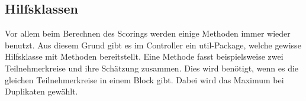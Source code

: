 \subsection{Hilfsklassen}\label{subsec:hilfsklassen}
Vor allem beim Berechnen des Scorings werden einige Methoden immer
wieder benutzt.
Aus diesem Grund gibt es im Controller ein util-Package,
welche gewisse Hilfsklasse mit Methoden bereitstellt.
Eine Methode fasst beispielsweise zwei Teilnehmerkreise und ihre Schätzung zusammen.
Dies wird benötigt, wenn es die gleichen Teilnehmerkreise in einem Block gibt.
Dabei wird das Maximum bei Duplikaten gewählt.